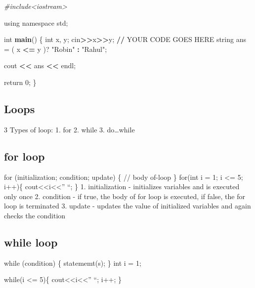 \documentclass[
]{article}
\newenvironment{Shaded}{\begin{snugshade}}{\end{snugshade}}
\newcommand{\CommentTok}[1]{\textcolor[rgb]{0.56,0.35,0.01}{\textit{#1}}}
\newcommand{\DecValTok}[1]{\textcolor[rgb]{0.00,0.00,0.81}{#1}}
\newcommand{\ErrorTok}[1]{\textcolor[rgb]{0.64,0.00,0.00}{\textbf{#1}}}
\newcommand{\FunctionTok}[1]{\textcolor[rgb]{0.13,0.29,0.53}{\textbf{#1}}}
\newcommand{\NormalTok}[1]{#1}
\newcommand{\OtherTok}[1]{\textcolor[rgb]{0.56,0.35,0.01}{#1}}
\newcommand{\SpecialCharTok}[1]{\textcolor[rgb]{0.81,0.36,0.00}{\textbf{#1}}}
\newcommand{\StringTok}[1]{\textcolor[rgb]{0.31,0.60,0.02}{#1}}
\begin{document}
\begin{Shaded}
\begin{Highlighting}[]
\CommentTok{\#include\textless{}iostream\textgreater{}}

\NormalTok{using namespace std;}

\NormalTok{int }\FunctionTok{main}\NormalTok{()  \{}
\NormalTok{    int x, y;}
\NormalTok{    cin}\SpecialCharTok{\textgreater{}}\ErrorTok{\textgreater{}}\NormalTok{x}\SpecialCharTok{\textgreater{}}\ErrorTok{\textgreater{}}\NormalTok{y;}
    \SpecialCharTok{/}\ErrorTok{/}\NormalTok{ YOUR CODE GOES HERE}
\NormalTok{    string ans }\OtherTok{=}\NormalTok{ ( x }\SpecialCharTok{\textless{}=}\NormalTok{ y )? }\StringTok{"Robin"} \SpecialCharTok{:} \StringTok{"Rahul"}\NormalTok{;}

\NormalTok{    cout }\SpecialCharTok{\textless{}}\ErrorTok{\textless{}}\NormalTok{ ans }\SpecialCharTok{\textless{}}\ErrorTok{\textless{}}\NormalTok{ endl;}

\NormalTok{    return }\DecValTok{0}\NormalTok{;}
\NormalTok{\}}
\end{Highlighting}
\end{Shaded}

\subsection{Loops}\label{loops}

3 Types of loop: 1. for 2. while 3. do\ldots while

\subsection{for loop}\label{for-loop}

for (initialization; condition; update) \{ // body of-loop \} for(int i
= 1; i \textless= 5; i++)\{ cout\textless\textless i\textless\textless''
``; \} 1. initialization - initializes variables and is executed only
once 2. condition - if true, the body of for loop is executed, if false,
the for loop is terminated 3. update - updates the value of initialized
variables and again checks the condition

\subsection{while loop}\label{while-loop}

while (condition) \{ statememt(s); \} int i = 1;

while(i \textless= 5)\{ cout\textless\textless i\textless\textless'' ``;
i++; \}
\end{document}
